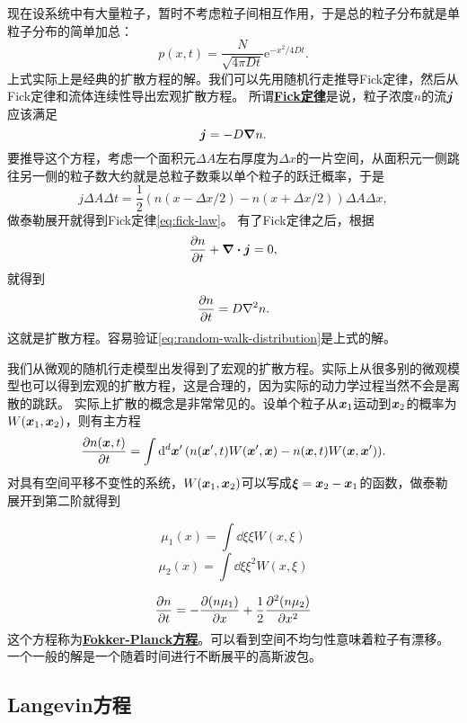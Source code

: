 \documentclass[hyperref, UTF8, a4paper]{ctexart}
\newcommand*{\ee}{\mathrm{e}}
\newcommand{\concept}[1]{\underline{\textbf{#1}}}
\begin{document}
现在设系统中有大量粒子，暂时不考虑粒子间相互作用，于是总的粒子分布就是单粒子分布的简单加总：
\begin{equation}
    p(x, t) = \frac{N}{\sqrt{4 \pi D t}} \ee^{- x^2 / 4 D t}.
    \label{eq:random-walk-distribution}
\end{equation}
上式实际上是经典的扩散方程的解。我们可以先用随机行走推导Fick定律，然后从Fick定律和流体连续性导出宏观扩散方程。
所谓\concept{Fick定律}是说，粒子浓度$n$的流$\vb*{j}$应该满足
\begin{equation}
    \vb*{j} = - D \grad{n}.
    \label{eq:fick-law}
\end{equation}
要推导这个方程，考虑一个面积元$\Delta A$左右厚度为$\Delta x$的一片空间，从面积元一侧跳往另一侧的粒子数大约就是总粒子数乘以单个粒子的跃迁概率，于是
\[
    j \Delta A \Delta t = \frac{1}{2} (n(x - \Delta x / 2) - n(x + \Delta x / 2)) \Delta A \Delta x,
\]
做泰勒展开就得到Fick定律\eqref{eq:fick-law}。
有了Fick定律之后，根据
\[
    \pdv{n}{t} + \div{\vb*{j}} = 0,
\]
就得到
\begin{equation}
    \pdv{n}{t} = D \laplacian{n}.
\end{equation}
这就是扩散方程。容易验证\eqref{eq:random-walk-distribution}是上式的解。

我们从微观的随机行走模型出发得到了宏观的扩散方程。实际上从很多别的微观模型也可以得到宏观的扩散方程，这是合理的，因为实际的动力学过程当然不会是离散的跳跃。
实际上扩散的概念是非常常见的。设单个粒子从$\vb*{x}_1$运动到$\vb*{x}_2$的概率为$W(\vb*{x}_1, \vb*{x}_2)$，则有主方程
\[
    \pdv{n(\vb*{x}, t)}{t} = \int \dd[d]{\vb*{x}'} (n(\vb*{x}', t) W(\vb*{x}', \vb*{x}) - n(\vb*{x}, t) W(\vb*{x}, \vb*{x}')).
\]
对具有空间平移不变性的系统，$W(\vb*{x}_1, \vb*{x}_2)$可以写成$\vb*{\xi} = \vb*{x}_2 - \vb*{x}_1$的函数，做泰勒展开到第二阶就得到

\begin{equation}
    \mu_1(x) = \int \dd{\xi} \xi W(x, \xi)
\end{equation}
\begin{equation}
    \mu_2(x) = \int \dd{\xi} \xi^2 W(x, \xi)
\end{equation}

\begin{equation}
    \pdv{n}{t} = - \pdv{(n \mu_1)}{x} + \frac{1}{2} \pdv[2]{(n \mu_2)}{x}
\end{equation}
这个方程称为\concept{Fokker-Planck方程}。可以看到空间不均匀性意味着粒子有漂移。一个一般的解是一个随着时间进行不断展平的高斯波包。

\subsection{Langevin方程}
\end{document}
